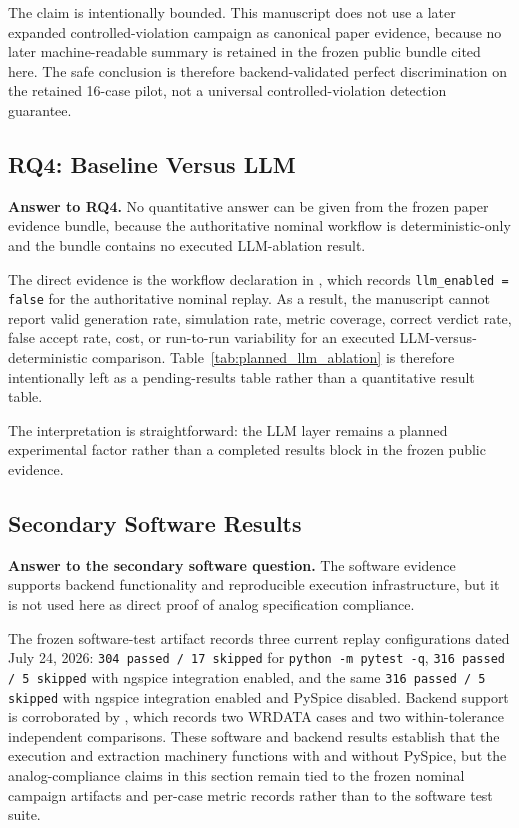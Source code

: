 The claim is intentionally bounded. This manuscript does not use a later expanded controlled-violation campaign as canonical paper evidence, because no later machine-readable summary is retained in the frozen public bundle cited here. The safe conclusion is therefore backend-validated perfect discrimination on the retained 16-case pilot, not a universal controlled-violation detection guarantee.

\subsection{RQ4: Baseline Versus LLM}
\textbf{Answer to RQ4.} No quantitative answer can be given from the frozen paper evidence bundle, because the authoritative nominal workflow is deterministic-only and the bundle contains no executed LLM-ablation result.

The direct evidence is the workflow declaration in , which records \texttt{llm\_enabled = false} for the authoritative nominal replay. As a result, the manuscript cannot report valid generation rate, simulation rate, metric coverage, correct verdict rate, false accept rate, cost, or run-to-run variability for an executed LLM-versus-deterministic comparison. Table~\ref{tab:planned_llm_ablation} is therefore intentionally left as a pending-results table rather than a quantitative result table.

The interpretation is straightforward: the LLM layer remains a planned experimental factor rather than a completed results block in the frozen public evidence.

\subsection{Secondary Software Results}
\textbf{Answer to the secondary software question.} The software evidence supports backend functionality and reproducible execution infrastructure, but it is not used here as direct proof of analog specification compliance.

The frozen software-test artifact  records three current replay configurations dated July 24, 2026: \texttt{304 passed / 17 skipped} for \texttt{python -m pytest -q}, \texttt{316 passed / 5 skipped} with ngspice integration enabled, and the same \texttt{316 passed / 5 skipped} with ngspice integration enabled and PySpice disabled. Backend support is corroborated by , which records two WRDATA cases and two within-tolerance independent comparisons. These software and backend results establish that the execution and extraction machinery functions with and without PySpice, but the analog-compliance claims in this section remain tied to the frozen nominal campaign artifacts and per-case metric records rather than to the software test suite.
